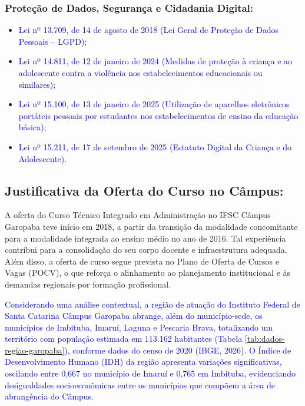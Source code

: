 \documentclass{../../modelos/latex-shared/ifsc-ppc}
\newcommand{\revisao}[1]{\textcolor{blue}{#1}}
\newcommand{\revisao}[1]{#1}
\newcommand{\semsumario}[1]{\addtocontents{toc}{\protect\setcounter{tocdepth}{2}}#1\addtocontents{toc}{\protect\setcounter{tocdepth}{4}}}
\begin{document}
\semsumario{\subsubsection{Proteção de Dados, Segurança e Cidadania Digital:}}
\begin{itemize}
    \item \revisao{Lei nº 13.709, de 14 de agosto de 2018 (Lei Geral de Proteção de Dados Pessoais -- LGPD);}
    \item \revisao{Lei nº 14.811, de 12 de janeiro de 2024 (Medidas de proteção à criança e ao adolescente contra a violência nos estabelecimentos educacionais ou similares);}
    \item \revisao{Lei nº 15.100, de 13 de janeiro de 2025 (Utilização de aparelhos eletrônicos portáteis pessoais por estudantes nos estabelecimentos de ensino da educação básica);}
    \item \revisao{Lei nº 15.211, de 17 de setembro de 2025 (Estatuto Digital da Criança e do Adolescente).}
\end{itemize}

\subsection{Justificativa da Oferta do Curso no Câmpus:}
A oferta do Curso Técnico Integrado em Administração no IFSC Câmpus Garopaba teve início em 2018, a partir da transição da modalidade concomitante para a modalidade integrada ao ensino médio no ano de 2016. Tal experiência contribui para a consolidação do seu corpo docente e infraestrutura adequada. Além disso, a oferta de curso segue prevista no Plano de Oferta de Cursos e Vagas (POCV), o que reforça o alinhamento ao planejamento institucional e às demandas regionais por formação profissional.

\revisao{Considerando uma análise contextual, a região de atuação do Instituto Federal de Santa Catarina Câmpus Garopaba abrange, além do município-sede, os municípios de Imbituba, Imaruí, Laguna e Pescaria Brava, totalizando um território com população estimada em 113.162 habitantes (Tabela \ref{tab:dados-regiao-garopaba}), conforme dados do censo de 2020 (IBGE, 2026). O Índice de Desenvolvimento Humano (IDH) da região apresenta variações significativas, oscilando entre 0,667 no município de Imaruí e 0,765 em Imbituba, evidenciando desigualdades socioeconômicas entre os municípios que compõem a área de abrangência do Câmpus.}
\end{document}
